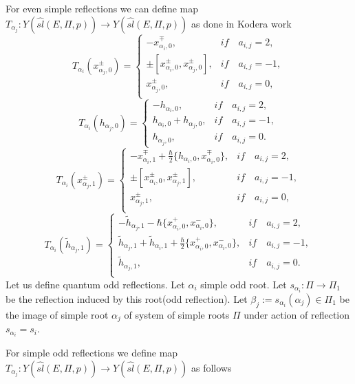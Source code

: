 \documentclass[english]{elsarticle}
\numberwithin{equation}{section}
\begin{document}
For even simple reflections we can define map $T_{\alpha_j}:Y(\hat{sl}(E,\Pi,p))\rightarrow Y(\hat{sl}(E,\Pi,p))$ as done in Kodera work \cite{Kodera}
\[
T_{\alpha_i}(x_{\alpha_j,0}^{\pm})=
\begin{cases}
         -x_{\alpha_i,0}^{\mp}, & if \quad a_{i,j}=2,\\
        \pm[x_{\alpha_i,0}^{\pm},x_{\alpha_j,0}^{\pm}], & if \quad a_{i,j}=-1,\\
         x_{\alpha_j,0}^{\pm}, & if \quad a_{i,j}=0,\\
\end{cases}
\]
\[
T_{\alpha_i}(h_{\alpha_j,0})=
\begin{cases}
    -h_{\alpha_i,0}, & if \quad a_{i,j}=2,\\
    h_{\alpha_i,0}+h_{\alpha_j,0}, & if \quad a_{i,j}=-1, \\
    h_{\alpha_j,0}, & if \quad a_{i,j}=0.
\end{cases}
\]
\[
T_{\alpha_i}(x_{\alpha_j,1}^{\pm})=
\begin{cases}
    -x_{\alpha_i,1}^{\mp}+\frac{\hbar}{2}\{h_{\alpha_i,0},x_{\alpha_i,0}^{\mp}\}, & if \quad a_{i,j}=2,\\
    \pm[x_{\alpha_i,0}^{\pm},x_{\alpha_j,1}^{\pm}], & if \quad a_{i,j}=-1,\\
     x_{\alpha_j,1}^{\pm}, & if \quad a_{i,j}=0,\\
\end{cases}
\]
\[
T_{\alpha_i}(\tilde{h}_{\alpha_j,1})=
\begin{cases}
    -\tilde{h}_{\alpha_j,1}-\hbar\{x_{\alpha_i,0}^{+},x_{\alpha_i,0}^{-}\},& if \quad a_{i,j}=2,\\
    \tilde{h}_{\alpha_j,1}+\tilde{h}_{\alpha_i,1}+\frac{\hbar}{2}\{x_{\alpha_i,0}^{+},x_{\alpha_i,0}^{-}\},& if \quad a_{i,j}=-1, \\
    \tilde{h}_{\alpha_j,1},& if \quad a_{i,j}=0.\\
\end{cases}
\]
Let us define quantum odd reflections. Let $\alpha_{i}$ simple odd root. Let $s_{\alpha_{i}}:\Pi \rightarrow \Pi_{1}$ be the reflection induced by this root(odd reflection). Let $\beta_{j}:=s_{\alpha_{i}}(\alpha_{j})\in \Pi_1$ be the image of simple root $\alpha_{j}$ of system of simple roots $\Pi$ under action of reflection $s_{\alpha_{i}}=s_{i}$.

For simple odd reflections we define map $T_{\alpha_j}:Y(\hat{sl}(E,\Pi,p))\rightarrow Y(\hat{sl}(E,\Pi,p))$ as follows
\end{document}
